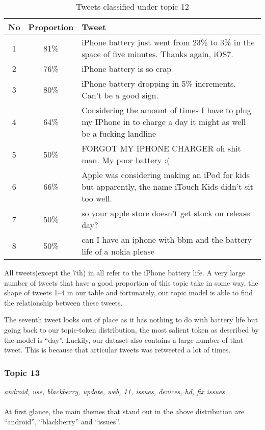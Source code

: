 \begin{table}[H]
  \begin{tabular}{c c p{13cm}} \toprule
    No & Proportion & Tweet \\ \midrule
    1  & 81\%       & iPhone battery just went from 23\% to 3\% in the space of five minutes. Thanks again, iOS7. \\ \midrule
    2  & 76\%       & iPhone battery is so crap \\ \midrule
    3  & 80\%       & iPhone battery dropping in 5\% increments. Can't be a good sign. \\ \midrule
    4  & 64\%       & Considering the amount of times I have to plug my IPhone in to charge a day it might as well be a fucking landline \\ \midrule
    5  & 50\%       & FORGOT MY IPHONE CHARGER oh shit man. My poor battery :( \\ \midrule
    6  & 66\%       & Apple was considering making an iPod for kids but apparently, the name iTouch Kids didn't sit too well. \\ \midrule
    7  & 50\%       & so your apple store doesn't get stock on release day? \\ \midrule
    8  & 50\%       & can I have an iphone with bbm and the battery life of a nokia please \\ \bottomrule
  \end{tabular}
  \caption{Tweets classified under topic 12}
  \label{tab:tweets_under_12}
\end{table}

All tweets(except the 7th) in  all refer to the iPhone battery life. A
very large number of tweets that have a good proportion of this topic take in some way, the shape of
tweets 1--4 in our table and fortunately, our topic model is able to find the relationship between
these tweets.

The seventh tweet looks out of place as it has nothing to do with battery life but
going back to our topic-token distribution, the most salient token as described by the model is
``day''. Luckily, our dataset also contains a large number of that tweet. This is because that
articular tweets was retweeted a lot of times.


\subsubsection{Topic 13}
\label{sec:topic_13}
\textit{android, use, blackberry, update, web, 11, issues, devices, hd, fix issues}\\\\
At first glance, the main themes that stand out in the above distribution are ``android'',
``blackberry'' and ``issues''.

